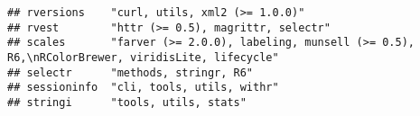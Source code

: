 \documentclass[]{book}
\begin{document}
\begin{verbatim}
## rversions    "curl, utils, xml2 (>= 1.0.0)"                                                                                                                                                                                                                                                                                                                                                                                                                                                                              
## rvest        "httr (>= 0.5), magrittr, selectr"                                                                                                                                                                                                                                                                                                                                                                                                                                                                          
## scales       "farver (>= 2.0.0), labeling, munsell (>= 0.5), R6,\nRColorBrewer, viridisLite, lifecycle"                                                                                                                                                                                                                                                                                                                                                                                                                  
## selectr      "methods, stringr, R6"                                                                                                                                                                                                                                                                                                                                                                                                                                                                                      
## sessioninfo  "cli, tools, utils, withr"                                                                                                                                                                                                                                                                                                                                                                                                                                                                                  
## stringi      "tools, utils, stats"                                                                                                                                                                                                                                                                                                                                                                                                                                                                                       

\end{verbatim}
\end{document}

